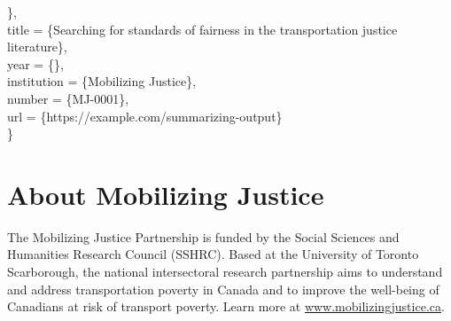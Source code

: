 \documentclass[12pt, oneside]{report}
\begin{document}
                                                                                \},\\
           \hspace*{1.6cm} title = \{Searching for standards of fairness
in the transportation justice literature\},\\
           \hspace*{1.6cm} year = \{\the\year\},\\
           \hspace*{1.6cm} institution = \{Mobilizing Justice\},\\
           \hspace*{1.6cm} number = \{MJ-0001\},\\
           \hspace*{1.6cm} url = \{https://example.com/summarizing-output\}\\
  \}

\vspace*{\fill}
{}

\newpage


\section*{About Mobilizing Justice}

The Mobilizing Justice Partnership is funded by the Social Sciences and Humanities Research Council (SSHRC). Based at the University of Toronto Scarborough, the national intersectoral research partnership aims to understand and address transportation poverty in Canada and to improve the well-being of Canadians at risk of transport poverty. Learn more at \url{www.mobilizingjustice.ca}.

\end{document}
